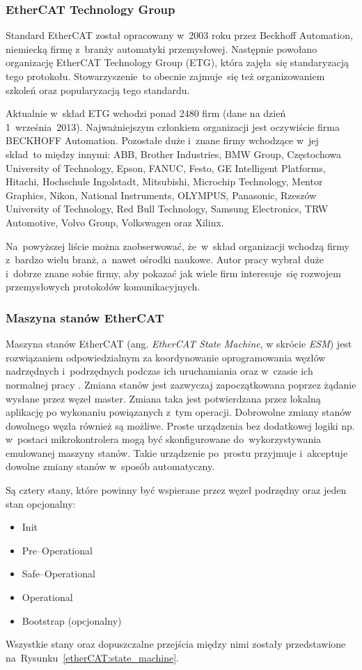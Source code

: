 \subsubsection{EtherCAT Technology Group}

Standard EtherCAT został opracowany w~2003 roku przez Beckhoff Automation, niemiecką firmę z~branży automatyki przemysłowej. Następnie powołano organizację EtherCAT Technology Group (ETG), która zajęła~się standaryzacją tego protokołu. Stowarzyszenie~to obecnie zajmuje~się też organizowaniem szkoleń oraz popularyzacją tego standardu. 

Aktualnie w~skład ETG wchodzi ponad 2480 firm (dane na dzień 1~września~2013). Najważniejszym członkiem organizacji jest oczywiście firma BECKHOFF Automation. Pozostałe duże i~znane firmy wchodzące w~jej skład~to między innymi: ABB, Brother Industries, BMW Group, Częstochowa University of Technology, Epson, FANUC, Festo, GE Intelligent Platforms, Hitachi, Hochschule Ingolstadt, Mitsubishi, Microchip Technology, Mentor Graphics, Nikon, National Instruments, OLYMPUS, Panasonic, Rzeszów University of Technology, Red Bull Technology, Samsung Electronics, TRW Automotive, Volvo Group, Volkswagen oraz Xilinx.

Na~powyższej liście można zaobserwować, że~w~skład organizacji wchodzą firmy z~bardzo wielu branż, a~nawet ośrodki naukowe. Autor pracy wybrał duże i~dobrze znane sobie firmy, aby pokazać jak wiele firm interesuje~się rozwojem przemysłowych protokołów komunikacyjnych.

\subsubsection{Maszyna stanów EtherCAT}
Maszyna stanów EtherCAT (ang. \textit{EtherCAT State Machine}, w skrócie \textit{ESM}) jest rozwiązaniem odpowiedzialnym za koordynowanie oprogramowania węzłów nadrzędnych i~podrzędnych podczas ich uruchamiania oraz w~czasie ich normalnej pracy \cite{FPGA_Xilinx}.
Zmiana stanów jest zazwyczaj zapoczątkowana poprzez żądanie wysłane przez węzeł master. Zmiana taka jest potwierdzana przez lokalną aplikację po wykonaniu powiązanych z~tym operacji. Dobrowolne zmiany stanów dowolnego węzła również są możliwe.
Proste urządzenia bez dodatkowej logiki np. w~postaci mikrokontrolera mogą być skonfigurowane do~wykorzystywania emulowanej maszyny stanów. Takie urządzenie po~prostu przyjmuje i~akceptuje dowolne zmiany stanów w~sposób automatyczny.

Są cztery stany, które powinny być wspierane przez węzeł podrzędny oraz jeden stan opcjonalny:
\begin{itemize}
\item Init
\item Pre--Operational
\item Safe--Operational
\item Operational
\item Bootstrap (opcjonalny)
\end{itemize}
Wszystkie stany oraz dopuszczalne przejścia między nimi zostały przedstawione na~Rysunku~\ref{etherCAT:state_machine}.

